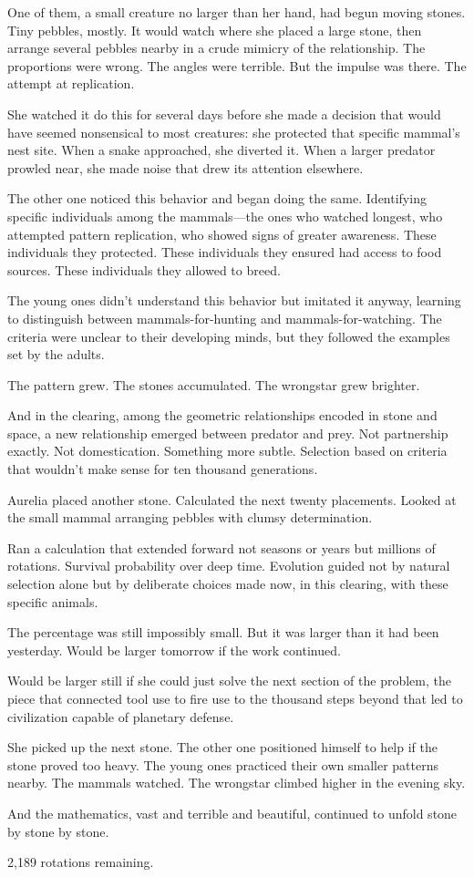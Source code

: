 One of them, a small creature no larger than her hand, had begun moving stones. Tiny pebbles, mostly. It would watch where she placed a large stone, then arrange several pebbles nearby in a crude mimicry of the relationship. The proportions were wrong. The angles were terrible. But the impulse was there. The attempt at replication.

She watched it do this for several days before she made a decision that would have seemed nonsensical to most creatures: she protected that specific mammal's nest site. When a snake approached, she diverted it. When a larger predator prowled near, she made noise that drew its attention elsewhere.

The other one noticed this behavior and began doing the same. Identifying specific individuals among the mammals—the ones who watched longest, who attempted pattern replication, who showed signs of greater awareness. These individuals they protected. These individuals they ensured had access to food sources. These individuals they allowed to breed.

The young ones didn't understand this behavior but imitated it anyway, learning to distinguish between mammals-for-hunting and mammals-for-watching. The criteria were unclear to their developing minds, but they followed the examples set by the adults.

The pattern grew. The stones accumulated. The wrongstar grew brighter.

And in the clearing, among the geometric relationships encoded in stone and space, a new relationship emerged between predator and prey. Not partnership exactly. Not domestication. Something more subtle. Selection based on criteria that wouldn't make sense for ten thousand generations.

Aurelia placed another stone. Calculated the next twenty placements. Looked at the small mammal arranging pebbles with clumsy determination.

Ran a calculation that extended forward not seasons or years but millions of rotations. Survival probability over deep time. Evolution guided not by natural selection alone but by deliberate choices made now, in this clearing, with these specific animals.

The percentage was still impossibly small. But it was larger than it had been yesterday. Would be larger tomorrow if the work continued.

Would be larger still if she could just solve the next section of the problem, the piece that connected tool use to fire use to the thousand steps beyond that led to civilization capable of planetary defense.

She picked up the next stone. The other one positioned himself to help if the stone proved too heavy. The young ones practiced their own smaller patterns nearby. The mammals watched. The wrongstar climbed higher in the evening sky.

And the mathematics, vast and terrible and beautiful, continued to unfold stone by stone by stone.

2,189 rotations remaining.


